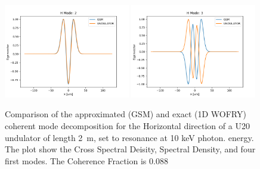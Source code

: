 \documentclass{iucr}              %
\begin{document}
\begin{figure}
    \includegraphics[width=0.49\textwidth]{figures/comparison_H_eigenvector2.png}
    \includegraphics[width=0.49\textwidth]{figures/comparison_H_eigenvector3.png}
        
    \caption{Comparison of the approximated (GSM) and exact (1D WOFRY) coherent mode decomposition  for the Horizontal direction of a U20 undulator of length \SI{2}{\meter},  set to resonance at 10 keV photon. energy. The plot show the Cross Spectral Deisity, Spectral Density, and four first modes. The Coherence Fraction is 0.088}
    \label{fig:GSMvsUND-H}
\end{figure}
\end{document}
